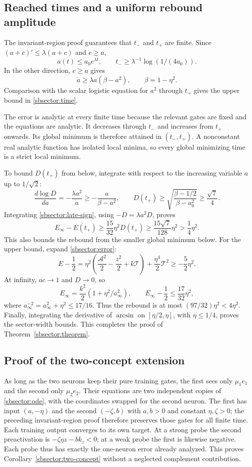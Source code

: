 \documentclass{article} %
\theoremstyle{plain}
\theoremstyle{definition}
\theoremstyle{remark}
\begin{document}
\subsection{Reached times and a uniform rebound amplitude}
The invariant-region proof guarantees that $t_-$ and $t_+$ are finite.
Since $(a+c)'\le\lambda(a+c)$ and $c\ge a$,
\[
 a(t)\le a_0e^{\lambda t},
 \qquad t_-\ge\lambda^{-1}\log(1/(4a_0)).
\]
In the other direction, $c\ge a$ gives
\[
 \dot a\ge\lambda a(\beta-a^2),\qquad \beta=1-\eta^2.
\]
Comparison with the scalar logistic equation for $a^2$ through $t_+$
gives the upper bound in \eqref{sbsector:time}.

The error is analytic at every finite time because the relevant gates
are fixed and the equations are analytic. It decreases through $t_-$
and increases from $t_+$ onwards. Its global minimum is therefore attained
in $(t_-,t_+)$. A nonconstant real analytic function has isolated local
minima, so every global minimizing time is a strict local minimum.

To bound $D(t_+)$ from below, integrate with respect to the increasing
variable $a$ up to $1/\sqrt2$:
\[
 \frac{d\log D}{da}=-\frac{\lambda a^2}{\dot a}
 \ge-\frac{a}{\beta-a^2},
 \qquad
 D(t_+)\ge
 \sqrt{\frac{\beta-1/2}{\beta-a_0^2}}
 \ge\frac{\sqrt7}{4}.
\]
Integrating \eqref{sbsector:late-sign}, using
$-\dot D=\lambda a^2D$, proves
\[
 E_\infty-E(t_+)
 \ge\frac{15}{32}\eta^2D(t_+)
 \ge\frac{15\sqrt7}{128}\eta^2>\frac14\eta^2.
\]
This also bounds the rebound from the smaller global minimum below.
For the upper bound, expand \eqref{sbsector:error}:
\[
 E-\frac12
 =\eta^2\left(\frac{\mathcal A^2}{2}-\frac{z^2}{2}
                         +k\mathcal T\right)
   +\frac{\eta^4}{2}\mathcal T^2\ge-\frac52\eta^2.
\]
At infinity, $ac\to1$ and $D\to0$, so
\[
 E_\infty=\frac{k^2}{2}(1+\eta^2/a_\infty^2),
 \qquad
 E_\infty-\frac12\le\frac{17}{32}\eta^2,
\]
where $a_\infty^{-2}=a_\infty^2+\eta^2\le17/16$.
Thus the rebound is at most $(97/32)\eta^2<4\eta^2$.
Finally, integrating the derivative of $\arcsin$ on
$[\eta/2,\eta]$, with $\eta\le1/4$, proves the sector-width bounds.
This completes the proof of Theorem~\ref{sbsector:theorem}.

\subsection{Proof of the two-concept extension}
As long as the two neurons keep their pure training gates, the first
sees only $\mu_1e_1$ and the second only $\mu_2e_2$. Their equations
are two independent copies of \eqref{sbsector:ode}, with the coordinates
swapped for the second neuron. The first has input $(a,-\eta)$ and
the second $(-\zeta,b)$ with $a,b>0$ and constant $\eta,\zeta>0$;
the preceding invariant-region proof therefore preserves those gates
for all finite time. Each training output converges to its own target.
At a strong probe the second preactivation is
$-\zeta\eta z-bk_z<0$; at a weak probe the first is likewise negative.
Each probe thus has exactly the one-neuron error already analyzed.
This proves Corollary~\ref{sbsector:two-concept} without a neglected
complement contribution.
\end{document}
